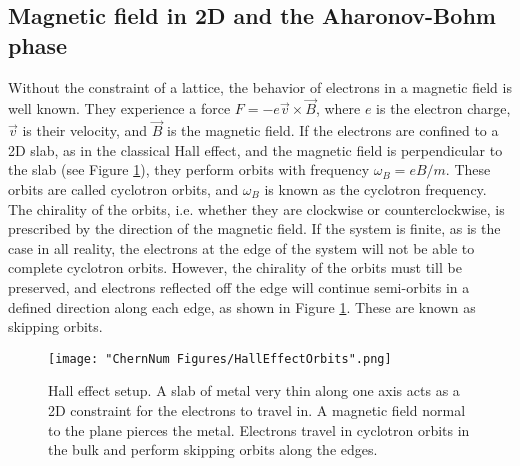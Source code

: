 \subsection{Magnetic field in 2D and the Aharonov-Bohm phase}
Without the constraint of a lattice, the behavior of electrons in a magnetic field is well known. They experience a force $F = - e\vec{v}\times\vec{B}$, where $e$ is the electron charge, $\vec{v}$ is their velocity, and $\vec{B}$ is the magnetic field. If the electrons are confined to a 2D slab, as in the classical Hall effect, and the magnetic field is perpendicular to the slab (see Figure \ref{fig:HallEffect}), they perform orbits with frequency  $\omega_B = eB/m$. These orbits are called cyclotron orbits, and $\omega_B$ is known as the cyclotron frequency. The chirality of the orbits, i.e. whether they are clockwise or counterclockwise, is prescribed by the direction of the magnetic field. If the system is finite, as is the case in all reality, the electrons at the edge of the system will not be able to complete cyclotron orbits. However, the chirality of the orbits must till be preserved, and electrons reflected off the edge will continue semi-orbits in a defined direction along each edge, as shown in Figure \ref{fig:HallEffect}.  These are known as skipping orbits. 
\begin{figure}
	\texttt{[image: "ChernNum Figures/HallEffectOrbits".png]}
\label{fig:HallEffect}
\caption[Hall effect setup]{Hall effect setup. A slab of metal very thin along one axis acts as a 2D constraint for the electrons to travel in. A magnetic field normal to the plane pierces the metal. Electrons travel in cyclotron orbits in the bulk and perform skipping orbits along the edges.}
\end{figure}

